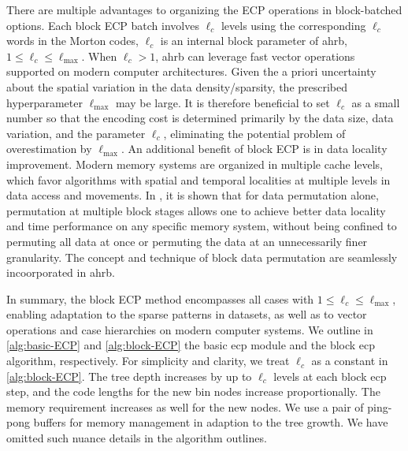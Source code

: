 \documentclass[final]{juliacon}
\begin{document}
There are multiple advantages to organizing the ECP operations in block-batched
options. Each block ECP batch involves $\ell_c$ levels using the
corresponding $\ell_c$ words in the Morton codes, $\ell_c$ is an internal block
parameter of {\sc ahrb}, $1 \leq \ell_c \leq \ell_{\max}$.
%
When $\ell_c>1$, {\sc ahrb} can leverage fast vector operations
supported on modern computer architectures.
%
Given the a priori uncertainty about the spatial variation in the data
density/sparsity, the prescribed hyperparameter $\ell_{\max}$ may be large. It
is therefore beneficial to set $\ell_{c}$ as a small number so that the encoding
cost is determined primarily by the data size, data variation, and the parameter
$\ell_{c}$, eliminating the potential problem of overestimation by
$\ell_{\max}$.
%
An additional benefit of block ECP is in data locality improvement. Modern
memory systems are organized in multiple cache levels, which favor algorithms
with spatial and temporal localities at multiple levels in data access and
movements. In \cite{floros2019}, it is shown that for data permutation
alone, permutation at multiple block stages allows one to achieve better data
locality and time performance on any specific memory system, without being
confined to permuting all data at once or permuting the data at an unnecessarily
finer granularity. The concept and technique of block data permutation are
seamlessly incoorporated in {\sc ahrb}.
%

In summary, the block ECP method encompasses all cases with $1\leq
\ell_{c} \leq \ell_{\max}$, enabling adaptation to the sparse patterns
in datasets, as well as to vector operations and case hierarchies on
modern computer systems.
%
We outline in \cref{alg:basic-ECP} and \cref{alg:block-ECP} the basic {\sc ecp}
module and the block {\sc ecp} algorithm, respectively.  For simplicity and
clarity, we treat $\ell_c$ as a constant in \cref{alg:block-ECP}.  The tree
depth increases by up to $\ell_c$ levels at each block {\sc ecp} step, and the
code lengths for the new bin nodes increase proportionally. The memory
requirement increases as well for the new nodes. We use a pair of ping-pong
buffers for memory management in adaption to the tree growth. We have omitted
such nuance details in the algorithm outlines.

%
%
%
 
%
%
%
\end{document}
